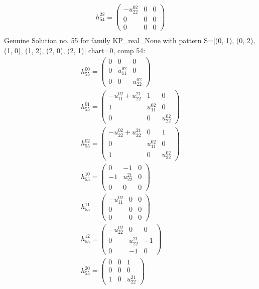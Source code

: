 \documentclass[a4paper, 11pt, twoside, onecolumn]{article}
\begin{document}
\begin{landscape}
\begin{gather*}
	 h_{54}^{22}=\begin{pmatrix}- u^{02}_{22} & 0 & 0\\0 & 0 & 0\\0 & 0 & 0\end{pmatrix}\\ 
\end{gather*} 
Genuine Solution no. 55 for family KP_real_None with pattern S=[(0, 1), (0, 2), (1, 0), (1, 2), (2, 0), (2, 1)] chart=0, comp 54: 
\begin{gather*} 
	 h_{55}^{00}=\begin{pmatrix}0 & 0 & 0\\0 & u^{02}_{11} & 0\\0 & 0 & u^{02}_{22}\end{pmatrix}\\ 
	 h_{55}^{01}=\begin{pmatrix}- u^{02}_{11} + u^{21}_{22} & 1 & 0\\1 & u^{02}_{11} & 0\\0 & 0 & u^{02}_{22}\end{pmatrix}\\ 
	 h_{55}^{02}=\begin{pmatrix}- u^{02}_{22} + u^{21}_{22} & 0 & 1\\0 & u^{02}_{11} & 0\\1 & 0 & u^{02}_{22}\end{pmatrix}\\ 
	 h_{55}^{10}=\begin{pmatrix}0 & -1 & 0\\-1 & u^{21}_{22} & 0\\0 & 0 & 0\end{pmatrix}\\ 
	 h_{55}^{11}=\begin{pmatrix}- u^{02}_{11} & 0 & 0\\0 & 0 & 0\\0 & 0 & 0\end{pmatrix}\\ 
	 h_{55}^{12}=\begin{pmatrix}- u^{02}_{22} & 0 & 0\\0 & u^{21}_{22} & -1\\0 & -1 & 0\end{pmatrix}\\ 
	 h_{55}^{20}=\begin{pmatrix}0 & 0 & 1\\0 & 0 & 0\\1 & 0 & u^{21}_{22}\end{pmatrix}\\ 

\end{gather*}
\end{landscape}
\end{document}
